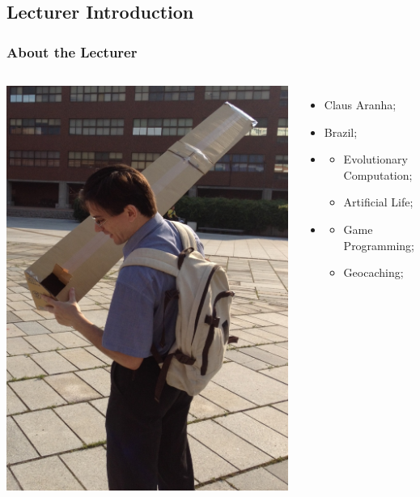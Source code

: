 \subsection{Lecturer Introduction}
\begin{frame}
  \frametitle{About the Lecturer}
  \begin{columns}
    \includegraphics[height=.8\textheight]{../img/pinhole}
    {\small
    \begin{itemize}
      \item {} Claus Aranha;
      \item {} Brazil;
      \item {}
      \begin{itemize}
        \item Evolutionary Computation;
        \item Artificial Life;
      \end{itemize}
      \item {}
      \begin{itemize}
        \item Game Programming;
        \item Geocaching;
      \end{itemize}
        \medskip


\end{itemize}}
\end{columns}
\end{frame}
